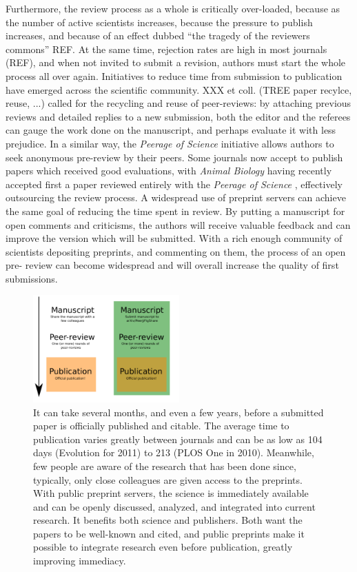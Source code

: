 \documentclass[letterpaper,twocolumn,superscriptaddress,showkeys]{revtex4-1}
\begin{document}
Furthermore, the review process as a whole is critically over-loaded, because
as the number of active scientists increases, because the pressure to publish
increases, and because of an effect dubbed ``the tragedy of the reviewers
commons'' REF.  At the same time, rejection rates are high in most journals
(REF), and when not invited to submit a revision, authors must start the whole
process all over again.  Initiatives to reduce time from submission to
publication have emerged across the scientific community. XXX et coll.  (TREE
paper recylce, reuse, ...) called for the recycling and reuse of peer-reviews:
by attaching previous reviews and detailed replies to a new submission, both
the editor and the referees can gauge the work done on the manuscript, and
perhaps evaluate it with less prejudice. In a similar way, the \emph{Peerage
of Science} initiative allows authors to seek anonymous pre-review by their
peers. Some journals now accept to publish papers which received good
evaluations, with \emph{Animal Biology} having recently accepted first a paper
reviewed entirely with the \emph{Peerage of Science} \cite{abb12}, effectively
outsourcing the review process. A widespread use of preprint servers can
achieve the same goal of reducing the time spent in review. By putting a
manuscript for open comments and criticisms, the authors will receive valuable
feedback and can improve the version which will be submitted. With a rich
enough community of scientists depositing preprints, and commenting on them,
the process of an open pre- review can become widespread and will overall
increase the quality of first submissions.

\begin{figure}[ht!] \centering\includegraphics[width=0.50\textwidth]{map.pdf}
\caption { It can take several months, and even a few years, before a submitted
paper is officially published and citable.  The average time to publication
varies greatly between journals and can be as low as 104 days (Evolution for
2011) to 213 (PLOS One in 2010).  Meanwhile, few people are aware of the
research that has been done since, typically, only close colleagues are given
access to the preprints. With public preprint servers, the science is
immediately available and can be openly discussed, analyzed, and integrated into
current research. It benefits both science and publishers. Both want the papers
to be well-known and cited, and public preprints make it possible to integrate
research even before publication, greatly improving immediacy.  }
\label{fig:map} \end{figure}
\end{document}
